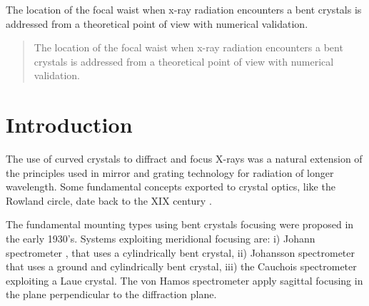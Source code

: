 \documentclass{iucr}              %
\begin{document}
\maketitle                        %

\begin{synopsis}
The location of the focal waist when x-ray radiation encounters a bent crystals is addressed from a theoretical point of view with numerical validation.
\end{synopsis}

\begin{abstract}
The location of the focal waist when x-ray radiation encounters a bent crystals is addressed from a theoretical point of view with numerical validation.
\end{abstract}



\section{Introduction}

The use of curved crystals to diffract and focus X-rays was a natural extension of the principles used in mirror and grating technology for radiation of longer wavelength. Some fundamental concepts exported to crystal optics, like the Rowland circle, date back to the XIX century \cite{rowland1882}.

The fundamental mounting types using bent crystals focusing were proposed in the early 1930’s. Systems exploiting meridional focusing are: i) Johann spectrometer \cite{Johann1931}, that uses a cylindrically bent crystal,  ii) Johansson spectrometer \cite{Johansson1933} that uses a ground and cylindrically bent crystal, iii) the Cauchois spectrometer \cite{cauchois1933} exploiting a Laue crystal. The von Hamos spectrometer \cite{V.Hamos1933} apply sagittal focusing in the plane perpendicular to the diffraction plane.
\end{document}
